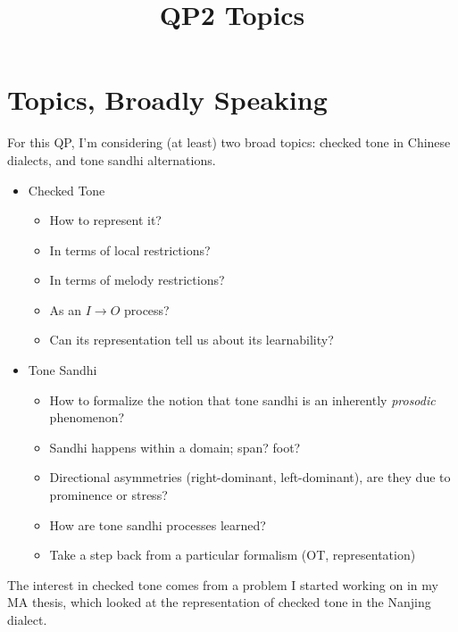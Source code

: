 \documentclass{article}
\title{QP2 Topics}
\begin{document}
\maketitle
\section{Topics, Broadly Speaking}
For this QP, I'm considering (at least) two broad topics: checked tone in Chinese dialects, and tone sandhi alternations.
\begin{itemize}
	\item Checked Tone
	\begin{itemize}
		\item How to represent it?
		\item In terms of local restrictions?
		\item In terms of melody restrictions?
		\item As an $I \rightarrow O$ process?
		\item Can its representation tell us about its learnability?
	\end{itemize}
	\item Tone Sandhi
	\begin{itemize}
		\item How to formalize the notion that tone sandhi is an inherently \textit{prosodic} phenomenon?
		\item Sandhi happens within a domain; span? foot?
		\item Directional asymmetries (right-dominant, left-dominant), are they due to prominence or stress?
		\item How are tone sandhi processes learned?
		\item Take a step back from a particular formalism (OT, representation)
	\end{itemize}
\end{itemize}
The interest in checked tone comes from a problem I started working on in my MA thesis, which looked at the representation of checked tone in the Nanjing dialect.
\end{document}
